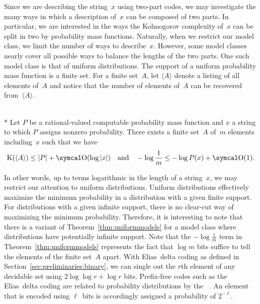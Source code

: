 Since we are describing the string~$x$ using two-part codes, we may investigate the many ways in which a description of~$x$ can be composed of two parts.
In particular, we are interested in the ways the Kolmogorov complexity of~$x$ can be split in two by probability mass functions.
Naturally, when we restrict our model class, we limit the number of ways to describe~$x$.
However, some model classes nearly cover all possible ways to balance the lengths of the two parts.
One such model class is that of uniform distributions.
The support of a uniform probability mass function is a finite set.
For a finite set~$A$, let $\langle A\rangle$ denote a listing of all elements of~$A$ and notice that the number of elements of~$A$ can be recovered from~$\langle A\rangle$.
\begin{theorem}\hspace{0pt}\\*
\label{thm:uniformmodels}%
  Let $P$ be a rational-valued computable probability mass function and $x$ a string to which $P$ assigns nonzero probability.
  There exists a finite set~$A$ of~$m$ elements including~$x$ such that we have
  \begin{equation*}
    \KC(\langle A\rangle) \le \length{P} + \bigO(\log \length{x}) \quad\text{and}\quad -\log \frac{1}{m} \le -\log P(x) + \bigO(1).
  \end{equation*}
\end{theorem}
In other words, up to terms logarithmic in the length of a string~$x$, we may restrict our attention to uniform distributions.
Uniform distributions effectively maximize the minimum probability in a distribution with a given finite support.
For distributions with a given infinite support, there is no clear-cut way of maximizing the minimum probability.
Therefore, it is interesting to note that there is a variant of Theorem~\ref{thm:uniformmodels} for a model class where distributions have potentially infinite support.
Note that the $-\log \frac{1}{m}$ term in Theorem~\ref{thm:uniformmodels} represents the fact that $\log m$ bits suffice to tell the elements of the finite set~$A$ apart.
With Elias~delta coding as defined in Section~\ref{sec:preliminaries:binary}, we can single out the $r$th element of any decidable set using $2 \log \log r + \log r$ bits.
Prefix-free codes such as the Elias~delta coding are related to probability distributions by the ~\parencite{cover2006elements,li2008introduction}.
An element that is encoded using $\ell$~bits is accordingly assigned a probability of $2^{-\ell}$.
